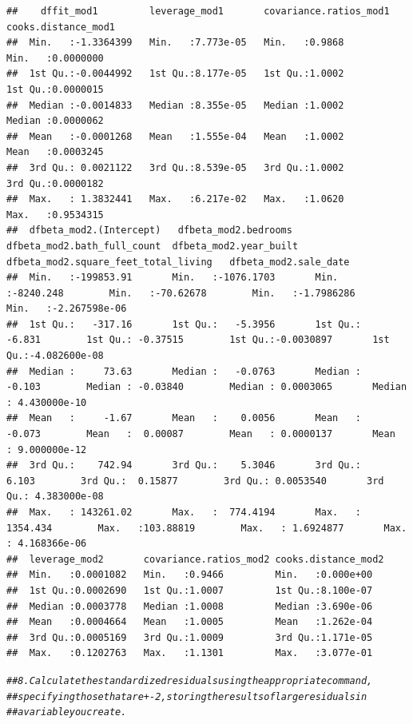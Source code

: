 \documentclass{article}\usepackage[]{graphicx}\usepackage[]{xcolor}
\makeatletter
\newcommand{\hlcom}[1]{\textcolor[rgb]{0.678,0.584,0.686}{\textit{#1}}}%
\newenvironment{kframe}{%
 \def\at@end@of@kframe{}%
 \ifinner\ifhmode%
  \def\at@end@of@kframe{\end{minipage}}%
  \begin{minipage}{\columnwidth}%
 \fi\fi%
 \def\FrameCommand##1{\hskip\@totalleftmargin \hskip-\fboxsep
 \colorbox{shadecolor}{##1}\hskip-\fboxsep
     \hskip-\linewidth \hskip-\@totalleftmargin \hskip\columnwidth}%
 \MakeFramed {\advance\hsize-\width
   \@totalleftmargin\z@ \linewidth\hsize
   \@setminipage}}%
 {\par\unskip\endMakeFramed%
 \at@end@of@kframe}
\newenvironment{knitrout}{}{} %
\makeatother
\begin{document}
\begin{knitrout}
\begin{kframe}
\begin{verbatim}
##    dffit_mod1         leverage_mod1       covariance.ratios_mod1 cooks.distance_mod1
##  Min.   :-1.3364399   Min.   :7.773e-05   Min.   :0.9868         Min.   :0.0000000  
##  1st Qu.:-0.0044992   1st Qu.:8.177e-05   1st Qu.:1.0002         1st Qu.:0.0000015  
##  Median :-0.0014833   Median :8.355e-05   Median :1.0002         Median :0.0000062  
##  Mean   :-0.0001268   Mean   :1.555e-04   Mean   :1.0002         Mean   :0.0003245  
##  3rd Qu.: 0.0021122   3rd Qu.:8.539e-05   3rd Qu.:1.0002         3rd Qu.:0.0000182  
##  Max.   : 1.3832441   Max.   :6.217e-02   Max.   :1.0620         Max.   :0.9534315  
##  dfbeta_mod2.(Intercept)   dfbeta_mod2.bedrooms    dfbeta_mod2.bath_full_count  dfbeta_mod2.year_built   dfbeta_mod2.square_feet_total_living   dfbeta_mod2.sale_date 
##  Min.   :-199853.91       Min.   :-1076.1703       Min.   :-8240.248        Min.   :-70.62678        Min.   :-1.7986286       Min.   :-2.267598e-06                   
##  1st Qu.:   -317.16       1st Qu.:   -5.3956       1st Qu.:   -6.831        1st Qu.: -0.37515        1st Qu.:-0.0030897       1st Qu.:-4.082600e-08                   
##  Median :     73.63       Median :   -0.0763       Median :   -0.103        Median : -0.03840        Median : 0.0003065       Median : 4.430000e-10                   
##  Mean   :     -1.67       Mean   :    0.0056       Mean   :   -0.073        Mean   :  0.00087        Mean   : 0.0000137       Mean   : 9.000000e-12                   
##  3rd Qu.:    742.94       3rd Qu.:    5.3046       3rd Qu.:    6.103        3rd Qu.:  0.15877        3rd Qu.: 0.0053540       3rd Qu.: 4.383000e-08                   
##  Max.   : 143261.02       Max.   :  774.4194       Max.   : 1354.434        Max.   :103.88819        Max.   : 1.6924877       Max.   : 4.168366e-06                   
##  leverage_mod2       covariance.ratios_mod2 cooks.distance_mod2
##  Min.   :0.0001082   Min.   :0.9466         Min.   :0.000e+00  
##  1st Qu.:0.0002690   1st Qu.:1.0007         1st Qu.:8.100e-07  
##  Median :0.0003778   Median :1.0008         Median :3.690e-06  
##  Mean   :0.0004664   Mean   :1.0005         Mean   :1.262e-04  
##  3rd Qu.:0.0005169   3rd Qu.:1.0009         3rd Qu.:1.171e-05  
##  Max.   :0.1202763   Max.   :1.1301         Max.   :3.077e-01
\end{verbatim}
\begin{alltt}
\hlcom{## 8. Calculate the standardized residuals using the appropriate command, }
\hlcom{## specifying those that are +-2, storing the results of large residuals in }
\hlcom{## a variable you create.}


\end{alltt}
\end{kframe}
\end{knitrout}
\end{document}
